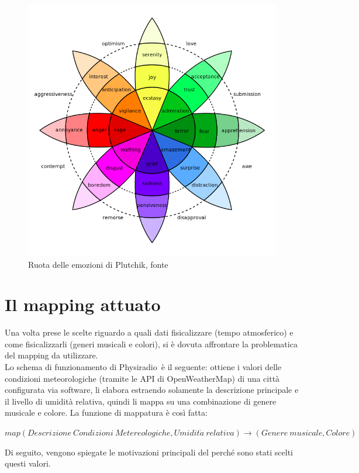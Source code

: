 \documentclass[12pt,a4paper]{report}
\newcommand{\physiradio}{Physiradio} %
\begin{document}


\begin{figure}
	\begin{center}
		\includegraphics[width=.5\textwidth]{../TesiScaravati/Paper_ensemble_notes_and_tables/Plutchik-wheel.png}
		\caption{Ruota delle emozioni di Plutchik, fonte \cite{wheelofemotions}}
		\label{fig:wheel_of_emotions}
	\end{center}
\end{figure}


\section{Il mapping attuato}\label{sec:mapping}

Una volta prese le scelte riguardo a quali dati fisicalizzare (tempo atmosferico) e come fisicalizzarli (generi musicali e colori), si è dovuta affrontare la problematica del mapping da utilizzare.\\  
Lo schema di funzionamento di \physiradio\ è il seguente: ottiene i valori delle condizioni meteorologiche (tramite le API di OpenWeatherMap) di una città configurata via software, li elabora estraendo solamente la descrizione principale e il livello di umidità relativa, quindi li mappa su una combinazione di genere musicale e colore. La funzione di mappatura è così fatta:

\begin{center}
	$map(Descrizione\ Condizioni\ Metereologiche, Umidit \grave{a} \ relativa) \rightarrow (Genere\ musicale, Colore)$
\end{center}

Di seguito, vengono spiegate le motivazioni principali del perché sono stati scelti questi valori.\\
\end{document}
